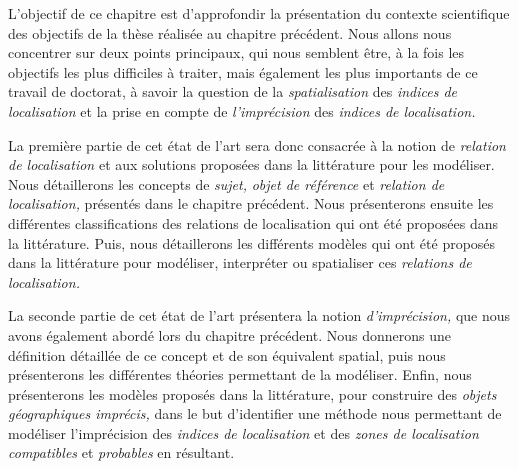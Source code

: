 L'objectif de ce chapitre est d'approfondir la présentation du
contexte scientifique des objectifs de la thèse réalisée au chapitre
précédent. Nous allons nous concentrer sur deux points principaux, qui
nous semblent être, à la fois les objectifs les plus difficiles à
traiter, mais également les plus importants de ce travail de doctorat,
à savoir la question de la \emph{spatialisation} des \emph{indices de
  localisation} et la prise en compte de \emph{l'imprécision} des
\emph{indices de localisation.}

La première partie de cet état de l'art sera donc consacrée à la
notion de \emph{relation de localisation} et aux solutions proposées
dans la littérature pour les modéliser. Nous détaillerons les concepts
de \emph{sujet,} \emph{objet de référence} et \emph{relation de
  localisation,} présentés dans le chapitre précédent. Nous
présenterons ensuite les différentes classifications des relations de
localisation qui ont été proposées dans la littérature. Puis, nous
détaillerons les différents modèles qui ont été proposés dans la
littérature pour modéliser, interpréter ou spatialiser ces \emph{relations
  de localisation.}

La seconde partie de cet état de l'art présentera la notion
\emph{d'imprécision,} que nous avons également abordé lors du chapitre
précédent. Nous donnerons une définition détaillée de ce concept et de
son équivalent spatial, puis nous présenterons les différentes
théories permettant de la modéliser. Enfin, nous présenterons les
modèles proposés dans la littérature, pour construire des \emph{objets
  géographiques imprécis,} dans le but d'identifier une méthode nous
permettant de modéliser l'imprécision des \emph{indices de
  localisation} et des \emph{zones de localisation compatibles} et
\emph{probables} en résultant.

